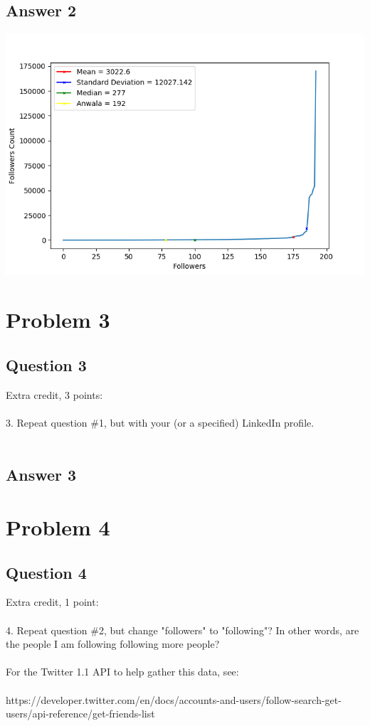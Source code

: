 \documentclass[10pt,letterpaper]{article}
\begin{document}
\subsection{Answer 2}
\includegraphics[scale=1]{Question2.png} 

\pagebreak
\section{Problem 3}
\subsection{Question 3}
Extra credit, 3 points:\\
\\
3.  Repeat question \#1, but with your (or a specified) LinkedIn profile.\\
\\
\subsection{Answer 3}


\pagebreak
\section{Problem 4}
\subsection{Question 4}
Extra credit, 1 point:\\
\\
4.  Repeat question \#2, but change "followers" to "following"?  In
other words, are the people I am following following more people?\\
\\
For the Twitter 1.1 API to help gather this data, see:\\
\\
https://developer.twitter.com/en/docs/accounts-and-users/follow-search-get-users/api-reference/get-friends-list\\
\\
\end{document}
